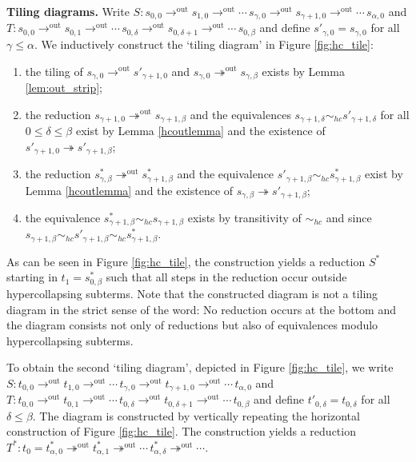 \documentclass{LMCS}
\theoremstyle{plain}
\theoremstyle{definition}
\newcommand{\rew}{\rightarrow}
\newcommand{\trewt}{\twoheadrightarrow}
\newcommand{\out}{\trewt^\mathrm{out}}
\newcommand{\outs}{\rew^\mathrm{out}}
\newcommand{\simhc}{\sim_{hc}}
\begin{document}
{\bf Tiling diagrams.}
Write $S : s_{0, 0} \outs s_{1, 0} \outs \cdots \, s_{\gamma, 0} \outs s_{\gamma + 1, 0} \outs \cdots \, s_{\alpha, 0}$ and $T : s_{0, 0} \outs s_{0, 1} \outs \cdots \, s_{0, \delta} \outs s_{0, \delta + 1} \outs \cdots \, s_{0, \beta}$ and define $s'_{\gamma, 0} = s_{\gamma, 0}$ for all $\gamma \leq \alpha$. We inductively construct the `tiling diagram' in Figure \ref{fig:hc_tile}:
\begin{enumerate}[$\bullet$]
\item
the tiling of $s_{\gamma, 0} \outs s'_{\gamma + 1, 0}$ and $s_{\gamma, 0} \out s_{\gamma, \beta}$ exists by Lemma \ref{lem:out_strip};
\item
the reduction $s_{\gamma + 1, 0} \out s_{\gamma + 1, \beta}$ and the equivalences $s_{\gamma + 1, \delta} \simhc s'_{\gamma + 1, \delta}$ for all $0 \leq \delta \leq \beta$ exist by Lemma \ref{hcoutlemma} and the existence of $s'_{\gamma + 1, 0} \trewt s'_{\gamma + 1, \beta}$;
\item
the reduction $s^*_{\gamma, \beta} \out s^*_{\gamma + 1, \beta}$ and the equivalence $s'_{\gamma + 1, \beta} \simhc s^*_{\gamma + 1, \beta}$ exist by Lemma \ref{hcoutlemma} and the existence of $s_{\gamma, \beta} \trewt s'_{\gamma + 1, \beta}$;
\item
the equivalence $s^*_{\gamma + 1, \beta} \simhc s_{\gamma + 1, \beta}$ exists by transitivity of $\simhc$ and since $s_{\gamma + 1, \beta} \simhc s'_{\gamma + 1, \beta} \simhc s^*_{\gamma + 1, \beta}$. 
\end{enumerate}
As can be seen in Figure \ref{fig:hc_tile}, the construction yields a reduction $S^*$ starting in $t_1 = s^*_{0, \beta}$ such that all steps in the reduction occur outside hypercollapsing subterms. Note that the constructed diagram is not a tiling diagram in the strict sense of the word: No reduction occurs at the bottom and the diagram consists not only of reductions but also of equivalences modulo hypercollapsing subterms.

To obtain the second `tiling diagram', depicted in Figure \ref{fig:hc_tile}, we write $S : t_{0, 0} \outs t_{1, 0} \outs \cdots \, t_{\gamma, 0} \outs t_{\gamma + 1, 0} \outs \cdots \, t_{\alpha, 0}$ and $T : t_{0, 0} \outs t_{0, 1} \outs \cdots \, t_{0, \delta} \outs t_{0, \delta + 1} \outs \cdots \, t_{0, \beta}$ and define $t'_{0, \delta} = t_{0, \delta}$ for all $\delta \leq \beta$. The diagram is constructed by vertically repeating the horizontal construction of Figure  \ref{fig:hc_tile}. The construction yields a reduction $T^* : t_0 = t^*_{\alpha, 0} \out t^*_{\alpha, 1} \out \cdots \, t^*_{\alpha, \delta} \out \cdots$.
\end{document}
